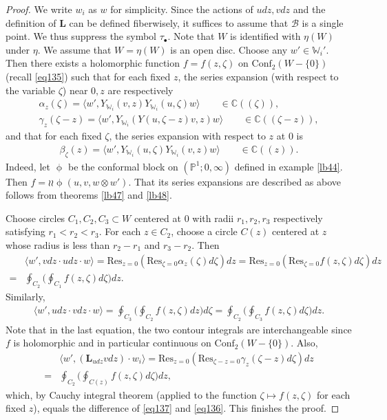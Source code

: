 \documentclass[12pt,a4paper,notitlepage]{report}
\theoremstyle{definition}
\theoremstyle{plain}
\newcommand{\mc}{\mathcal}
\newcommand{\Conf}{\mathrm{Conf}}
\newcommand{\Res}{\mathrm{Res}}
\newcommand{\bk}[1]{\langle {#1}\rangle}
\newcommand{\mbf}{\mathbf}
\newcommand{\blt}{\bullet}
\newcommand{\Wbb}{\mathbb W}
\newcommand{\Cbb}{\mathbb C}
\newcommand{\Pbb}{\mathbb P}
\numberwithin{equation}{section}
\begin{document}
\begin{proof}
We write $w_i$ as $w$ for simplicity. Since the actions of $udz,vdz$ and the definition of $\mbf L$ can be defined fiberwisely, it suffices to assume that $\mc B$ is a single point. We thus suppress the symbol $\tau_\blt$. Note that $W$ is identified with $\eta(W)$ under $\eta$. We assume that $W=\eta(W)$ is an open disc. Choose any $w'\in\Wbb_i'$. Then there exists a holomorphic function $f=f(z,\zeta)$ on $\Conf_2(W-\{0\})$ (recall \eqref{eq135}) such that for each fixed $z$, the series expansion (with respect to the variable $\zeta$) near $0,z$ are respectively
\begin{gather*}
\alpha_z(\zeta)=\bk{w',Y_{\Wbb_i}(v,z)Y_{\Wbb_i}(u,\zeta)w}\qquad\in\Cbb((\zeta)),\\
\gamma_z(\zeta-z)=\bk{w',Y_{\Wbb_i}(Y(u,\zeta-z)v,z)w}\qquad\in\Cbb((\zeta-z)),
\end{gather*}
and that for each fixed $\zeta$, the series expansion with respect to $z$ at $0$ is
\begin{align*}
\beta_\zeta(z)=\bk{w',Y_{\Wbb_i}(u,\zeta)Y_{\Wbb_i}(v,z)w}\qquad\in\Cbb((z)).
\end{align*}
Indeed, let $\upphi$ be the conformal block on $(\Pbb^1;0,\infty)$ defined in example \ref{lb44}. Then $f=\wr\wr\upphi(u,v,w\otimes w')$. That its series expansions are described as above follows from theorems \ref{lb47} and \ref{lb48}.



Choose circles $C_1,C_2,C_3\subset W$ centered at $0$ with radii $r_1,r_2,r_3$ respectively satisfying $r_1<r_2<r_3$. For each $z\in C_2$, choose a circle $C(z)$ centered at $z$ whose radius is less than $r_2-r_1$ and $r_3-r_2$. Then 
\begin{align}
&\bk{w',vdz\cdot udz\cdot w}=\Res_{z=0}(\Res_{\zeta=0}\alpha_z(\zeta)d\zeta)dz=\Res_{z=0}(\Res_{\zeta=0}f(z,\zeta)d\zeta)dz\nonumber\\
=&\oint_{C_2}\Bigg(\oint_{C_1}f(z,\zeta)d\zeta\Bigg)dz.\label{eq136}
\end{align}
Similarly,
\begin{align}
\bk{w',udz\cdot vdz\cdot w}=\oint_{C_3}\Bigg(\oint_{C_2}f(z,\zeta)dz\Bigg)d\zeta=\oint_{C_2}\Bigg(\oint_{C_3}f(z,\zeta)d\zeta\Bigg)dz.\label{eq137}
\end{align}
Note that in the last equation, the two contour integrals are interchangeable since $f$ is holomorphic and in particular continuous on $\Conf_2(W-\{0\})$. Also, 
\begin{align*}
&\bk{w',(\mbf L_{udz}vdz)\cdot w_i}=\Res_{z=0}(\Res_{\zeta-z=0}\gamma_z(\zeta-z)d\zeta)dz\nonumber\\
=&\oint_{C_2}\Bigg(\oint_{C(z)}f(z,\zeta)d\zeta \Bigg)dz,
\end{align*}
which, by Cauchy integral theorem (applied to the function $\zeta\mapsto f(z,\zeta)$ for each fixed $z$), equals the difference of \eqref{eq137} and \eqref{eq136}. This finishes the proof.
\end{proof}
\end{document}
